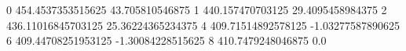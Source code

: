 0 454.4537353515625 43.705810546875
1 440.157470703125 29.4095458984375
2 436.11016845703125 25.36224365234375
4 409.71514892578125 -1.03277587890625
6 409.44708251953125 -1.30084228515625
8 410.7479248046875 0.0
